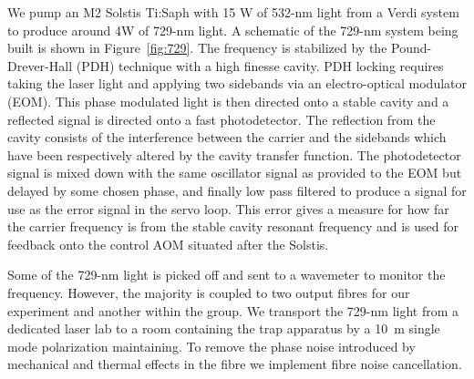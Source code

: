 \documentclass[12pt]{iopart}
\begin{document}
We pump an M2 Solstis Ti:Saph with 15 W of 532-nm light from a Verdi
system to produce around 4W of 729-nm light.  A schematic of the
729-nm system being built is shown in Figure~\ref{fig:729}. The
frequency is
stabilized by the Pound-Drever-Hall (PDH) technique with a high
finesse cavity. PDH locking requires taking the laser light and
applying two sidebands via an electro-optical modulator (EOM). This
phase modulated light is then directed onto a stable cavity and a
reflected signal is directed onto a fast photodetector. The reflection
from the cavity consists of the interference between the carrier and
the sidebands which have been respectively altered by the cavity
transfer function. The photodetector signal is mixed down with the
same oscillator signal as provided to the EOM but delayed by some chosen
phase, and finally low pass filtered to produce a signal for use as
the error signal in the servo loop.  This error gives a measure for
how far the carrier frequency is from the stable cavity resonant
frequency and is used for feedback onto the control AOM situated after
the Solstis.

Some of the 729-nm light is picked off and sent to a wavemeter to
monitor the frequency. However, the majority is coupled to two output
fibres for our experiment and another within the group. We transport
the 729-nm light from a dedicated laser lab to a room containing the
trap apparatus by a 10~m single mode polarization maintaining.  To
remove the phase noise introduced by mechanical and thermal effects in
the fibre we implement fibre noise cancellation.




\end{document}
